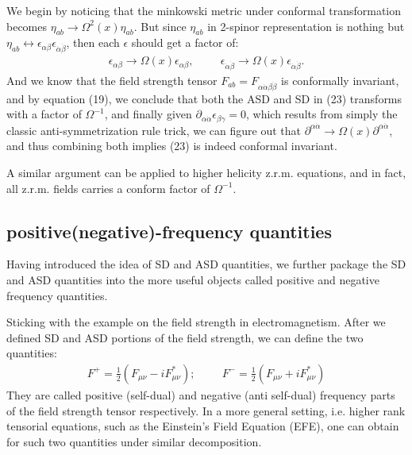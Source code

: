 \documentclass{article}
\begin{document}
 We begin by noticing that the minkowski metric under conformal
 transformation becomes $ \eta_{ab} \to \Omega^2(x) \eta_{ab}. $ But since
 $\eta_{ab}$ in 2-spinor representation is nothing but  $\eta_{ab}
 \leftrightarrow \epsilon_{\alpha \beta} \epsilon_{\dot{\alpha}
 \dot{\beta}}$, then each $\epsilon$ should get a factor of: 
 \begin{align}
   \label{levi-civita conformity}
   \epsilon_{\alpha \beta} \to \Omega(x) \epsilon_{\alpha \beta},
   \hspace{1cm} \epsilon_{\dot{\alpha} \dot{\beta}} \to \Omega(x)
   \epsilon_{\dot{\alpha} \dot{\beta}}. 
 \end{align}
 And we know that the field strength tensor $F_{ab} = F_{\alpha \dot{\alpha}
 \beta \dot{\beta}}$ is conformally invariant, and by equation (19), we
 conclude that both the ASD and SD in (23) transforms with a factor of
 $\Omega^{-1}$, and finally given $ \partial_{\alpha \dot{\alpha}}^{}
 \epsilon_{\beta \gamma} = 0$, which results from simply the classic
 anti-symmetrization rule trick, we can figure out that
 $\partial^{\alpha \dot{\alpha}} \to
 \Omega(x)\partial_{}^{\alpha \dot{\alpha}}$, and thus combining both implies
 (23) is indeed conformal invariant.

 A similar argument can be applied to higher helicity z.r.m. equations,
 and in fact, all z.r.m. fields carries a conform factor of
 $\Omega^{-1}$.




\subsection{positive(negative)-frequency quantities}%
  \label{sub:positive(negative)-frequency quantities)}
 Having introduced the idea of SD and ASD quantities, we further package the
 SD and ASD quantities into the more useful objects called positive
 and negative frequency quantities. 

 Sticking with the example on the field
 strength in electromagnetism. After we defined SD and ASD portions of
 the field strength, we can define the two quantities: \\ 
 \begin{align}
  \label{positive/negative frequency objects and zero helicity objects}
   F^+ = \frac{1}{2}(F_{\mu \nu} - i F^{*}_{\mu \nu});
   \hspace{1cm} F^- = \frac{1}{2}(F_{\mu \nu} + i F^{*}_{\mu \nu}) 
 \end{align}
 They are called positive (self-dual) and negative (anti self-dual) frequency parts of the field
 strength tensor respectively.
  In a more general setting, i.e. higher
  rank tensorial equations, such as the Einstein's Field Equation (EFE), one
  can obtain for such two quantities under similar decomposition. 
\end{document}
